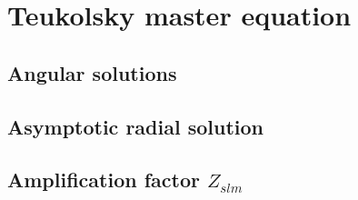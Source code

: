 
\chapter{Teukolsky master equation} %
\label{Chapter3}


\section{Angular solutions}

\section{Asymptotic radial solution}

\section{Amplification factor $Z_{slm}$}


\cleardoublepage